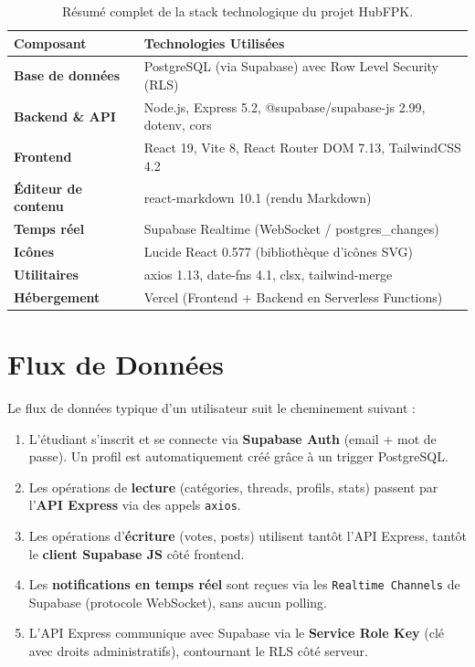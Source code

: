 \documentclass[12pt, a4paper]{report}
\begin{document}
\begin{table}[H]
\centering
\renewcommand{\arraystretch}{1.4}
\begin{tabularx}{\textwidth}{>{\bfseries}l X}
\toprule
\textbf{Composant} & \textbf{Technologies Utilisées} \\
\midrule
Base de données & PostgreSQL (via Supabase) avec Row Level Security (RLS) \\
Backend \& API & Node.js, Express 5.2, @supabase/supabase-js 2.99, dotenv, cors \\
Frontend & React 19, Vite 8, React Router DOM 7.13, TailwindCSS 4.2 \\
Éditeur de contenu & react-markdown 10.1 (rendu Markdown) \\
Temps réel & Supabase Realtime (WebSocket / postgres\_changes) \\
Icônes & Lucide React 0.577 (bibliothèque d'icônes SVG) \\
Utilitaires & axios 1.13, date-fns 4.1, clsx, tailwind-merge \\
Hébergement & Vercel (Frontend + Backend en Serverless Functions) \\
\bottomrule
\end{tabularx}
\caption{Résumé complet de la stack technologique du projet HubFPK.}
\end{table}

\section{Flux de Données}

Le flux de données typique d'un utilisateur suit le cheminement suivant :

\begin{enumerate}
    \item L'étudiant s'inscrit et se connecte via \textbf{Supabase Auth} (email + mot de passe). Un profil est automatiquement créé grâce à un trigger PostgreSQL.
    \item Les opérations de \textbf{lecture} (catégories, threads, profils, stats) passent par l'\textbf{API Express} via des appels \texttt{axios}.
    \item Les opérations d'\textbf{écriture} (votes, posts) utilisent tantôt l'API Express, tantôt le \textbf{client Supabase JS} côté frontend.
    \item Les \textbf{notifications en temps réel} sont reçues via les \texttt{Realtime Channels} de Supabase (protocole WebSocket), sans aucun polling.
    \item L'API Express communique avec Supabase via le \textbf{Service Role Key} (clé avec droits administratifs), contournant le RLS côté serveur.
\end{enumerate}
\end{document}
